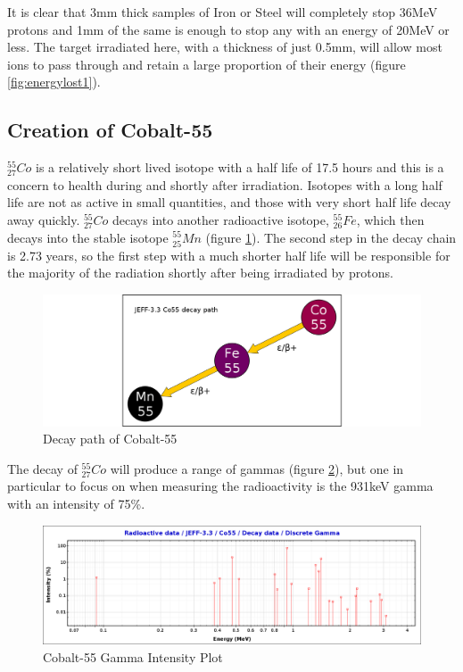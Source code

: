 It is clear that 3mm thick samples of Iron or Steel will completely stop 36MeV protons and 1mm of the same is enough to stop any with an energy of 20MeV or less.  The target irradiated here, with a thickness of just 0.5mm, will allow most ions to pass through and retain a large proportion of their energy (figure \ref{fig:energylost1}).


\subsection{Creation of Cobalt-55}

${}^{55}_{27} Co$ is a relatively short lived isotope with a half life of 17.5 hours and this is a concern to health during and shortly after irradiation.  Isotopes with a long half life are not as active in small quantities, and those with very short half life decay away quickly.  ${}^{55}_{27} Co$ decays into another radioactive isotope, ${}^{55}_{26} Fe$, which then decays into the stable isotope ${}^{55}_{25} Mn$ (figure \ref{fig:DecayPathCo55}).  The second step in the decay chain is 2.73 years, so the first step with a much shorter half life will be responsible for the majority of the radiation shortly after being irradiated by protons.

\FloatBarrier
\begin{figure}[h]
  \begin{center}
    \includegraphics[width=0.8\linewidth]{chapters/activity_code/fe-co55/Co55_decay_path.png}
    \caption{Decay path of Cobalt-55}
    \label{fig:DecayPathCo55}
  \end{center}
\end{figure}

\FloatBarrier
The decay of ${}^{55}_{27} Co$ will produce a range of gammas (figure \ref{fig:Co55GammaIntensity}), but one in particular to focus on when measuring the radioactivity is the 931keV gamma with an intensity of 75\%.

\FloatBarrier
\begin{figure}[h]
  \begin{center}
    \includegraphics[width=0.9\linewidth]{chapters/activity_code/co55/Co_55_gamma_2.png}
    \caption{Cobalt-55 Gamma Intensity Plot}
    \label{fig:Co55GammaIntensity}
  \end{center}
\end{figure}

